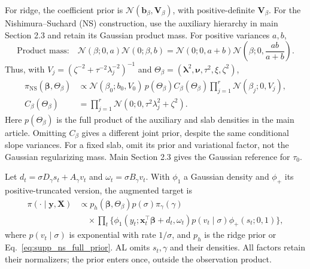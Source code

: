 \documentclass[12pt,letterpaper]{article}
\newcommand{\vect}[1]{\bm{#1}}
\newcommand{\mat}[1]{\bm{#1}}
\newcommand{\Normal}{\mathcal{N}}
\numberwithin{suppalgorithm}{section}
\numberwithin{equation}{section}
\numberwithin{table}{section}
\numberwithin{figure}{section}
\begin{document}
For ridge, the coefficient prior is
\(\Normal(\vect b_\beta,\mat V_\beta)\), with positive-definite
\(\mat V_\beta\). For the Nishimura--Suchard (NS) construction, use the
auxiliary hierarchy in main Section 2.3 and retain its Gaussian product
mass. For positive variances \(a,b\),
\begin{equation}
\text{Product mass:}\quad
\Normal(\beta;0,a)\Normal(0;\beta,b)
=\Normal(0;0,a+b)\Normal\!\left(\beta;0,\frac{ab}{a+b}\right).
\label{eq:supp_ns_product_factor}
\end{equation}
Thus, with \(V_j=(\zeta^{-2}+\tau^{-2}\lambda_j^{-2})^{-1}\) and
\(\Theta_\beta=(\vect\lambda^2,\vect\nu,\tau^2,\xi,\zeta^2)\),
\begin{equation}
\begin{aligned}
\pi_{\mathrm{NS}}(\vect\beta,\Theta_\beta)
&\propto\Normal(\beta_0;b_0,V_0)\,p(\Theta_\beta)
 C_\beta(\Theta_\beta)\prod_{j=1}^r\Normal(\beta_j;0,V_j),\\
C_\beta(\Theta_\beta)
&=\prod_{j=1}^r\Normal(0;0,\tau^2\lambda_j^2+\zeta^2).
\end{aligned}
\label{eq:supp_ns_full_prior}
\end{equation}
Here \(p(\Theta_\beta)\) is the full product of the auxiliary and slab
densities in the main article. Omitting \(C_\beta\) gives a different
joint prior, despite the same conditional slope variances. For a fixed
slab, omit its prior and variational factor, not the Gaussian regularizing
mass. Main Section 2.3 gives the Gaussian reference for \(\tau_0\).

Let \(d_t=\sigma D_\gamma s_t+A_\gamma v_t\) and
\(\omega_t=\sigma B_\gamma v_t\). With \(\phi_1\) a Gaussian density
and \(\phi_+\) its positive-truncated version, the augmented target is
\begin{equation}
\begin{aligned}
\pi(\cdot\mid\vect y,\mat X)&\propto
 p_h(\vect\beta,\Theta_\beta)p(\sigma)\pi_\gamma(\gamma)\\
&\quad\times\prod_t\{
 \phi_1(y_t;\vect x_t^\top\vect\beta+d_t,\omega_t)
 p(v_t\mid\sigma)\phi_+(s_t;0,1)\},
\end{aligned}
\label{eq:supp-generic-augmented-target}
\end{equation}
where \(p(v_t\mid\sigma)\) is exponential with rate \(1/\sigma\), and
\(p_h\) is the ridge prior or Eq.~\eqref{eq:supp_ns_full_prior}.
AL omits \(s_t,\gamma\) and their densities. All factors retain their
normalizers; the prior enters once, outside the observation product.
\end{document}

